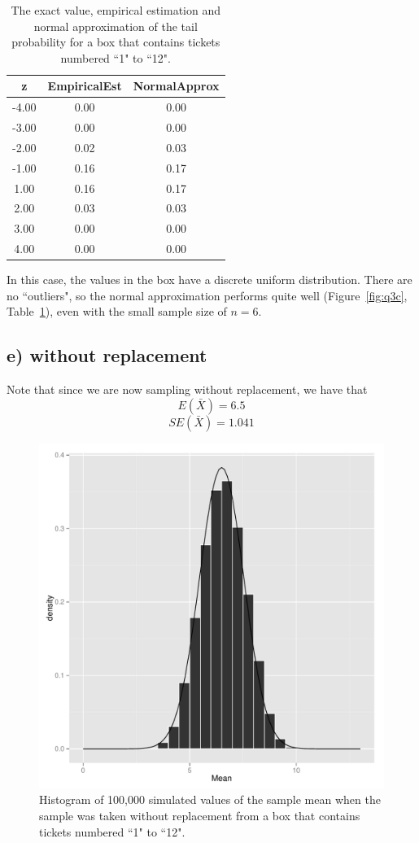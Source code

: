 \documentclass[11pt]{article}
\begin{document}
\begin{table}[H]
\centering
\begin{tabular}{|c|cc|}
  \hline
z & EmpiricalEst & NormalApprox \\ 
  \hline
-4.00 & 0.00 & 0.00 \\ 
  -3.00 & 0.00 & 0.00 \\ 
  -2.00 & 0.02 & 0.03 \\ 
  -1.00 & 0.16 & 0.17 \\ 
  1.00 & 0.16 & 0.17 \\ 
  2.00 & 0.03 & 0.03 \\ 
  3.00 & 0.00 & 0.00 \\ 
  4.00 & 0.00 & 0.00 \\ 
   \hline
\end{tabular}
\caption{The exact value, empirical estimation and normal approximation of the tail probability for a box that contains tickets numbered ``1" to ``12".} \label{tab:q3c}
\end{table}

\noindent In this case, the values in the box have a discrete uniform distribution.  There are no ``outliers", so the normal approximation performs quite well (Figure~\ref{fig:q3c}, Table~\ref{tab:q3c}), even with the small sample size of $n=6$.



\subsection*{e) without replacement}


\noindent Note that since we are now sampling without replacement, we have that
$$E(\bar{X})= 6.5$$ 
$$SE(\bar{X}) = 1.041$$


\begin{figure}[H]
\centering
\includegraphics[width = .5\textwidth]{histogram_3e-1.pdf}
\caption{Histogram of 100,000 simulated values of the sample mean when the sample was taken without replacement from a box that contains tickets numbered ``1" to ``12".}
\end{figure}
\end{document}
